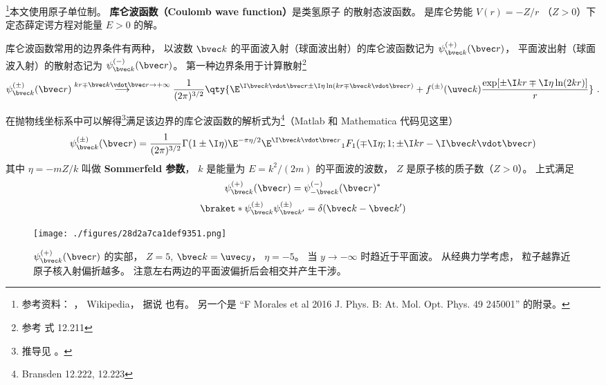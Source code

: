 

\footnote{参考资料： \cite{Bransden}， Wikipedia， 据说 \cite{Merzbacher} 也有。 另一个是 “F Morales et al 2016 J. Phys. B: At. Mol. Opt. Phys. 49 245001” 的附录。}本文使用原子单位制。 \textbf{库仑波函数（Coulomb wave function）}是类氢原子 的散射态波函数。
是库仑势能 $V(r) = -Z/r$ （$Z > 0$）下定态薛定谔方程对能量 $E > 0$ 的解。

库仑波函数常用的边界条件有两种， 以波数 $\bvec k$ 的平面波入射（球面波出射）的库仑波函数记为 $\psi_{\bvec k}^{(+)}(\bvec r)$， 平面波出射（球面波入射）的散射态记为 $\psi_{\bvec k}^{(-)}(\bvec r)$。 第一种边界条用于计算散射\footnote{参考\cite{Bransden} 式 12.211}
\begin{equation}\label{eq_CulmWf_4}
\psi_{\bvec k}^{(\pm)}(\bvec r) \overset{kr \mp \bvec k \vdot\bvec r \to +\infty}{\longrightarrow} \frac{1}{(2\pi)^{3/2}} \qty{\E^{\I\bvec k\vdot\bvec r \pm \I\eta\ln (kr \mp \bvec k \vdot\bvec r)}
+ f^{(\pm)}(\uvec k) \frac{\exp[\pm\I kr \mp \I\eta \ln(2kr)]}{r}}~.
\end{equation}

在抛物线坐标系中可以解得\footnote{推导见 \cite{Bransden}。}满足该边界的库仑波函数的解析式为\footnote{Bransden\cite{Bransden} 12.222, 12.223}（Matlab 和 Mathematica 代码见这里）
\begin{equation}\label{eq_CulmWf_7}
\psi_{\bvec k}^{(\pm)}(\bvec r) = \frac{1}{(2\pi)^{3/2}} \Gamma(1\pm \I\eta)\E^{-\pi\eta/2} \E^{\I\bvec k\vdot\bvec r} {_1F_1}(\mp\I\eta; 1; \pm\I kr - \I \bvec k\vdot \bvec r)
\end{equation}
其中 $\eta = -mZ/k$ 叫做 \textbf{Sommerfeld 参数}， $k$ 是能量为 $E = k^2/(2m)$ 的平面波的波数， $Z$ 是原子核的质子数（$Z > 0$）。 上式满足
\begin{equation}
\psi_{\bvec k}^{(+)}(\bvec r) = \psi_{-\bvec k}^{(-)}(\bvec r)^*
\end{equation}
\begin{equation}
\braket*{\psi_{\bvec k}^{(\pm)}}{\psi_{\bvec k'}^{(\pm)}} = \delta(\bvec k - \bvec k')
\end{equation}

\begin{figure}[ht]
\centering
\texttt{[image: ./figures/28d2a7ca1def9351.png]} %
\caption{$\psi_{\bvec k}^{(+)}(\bvec r)$ 的实部， $Z = 5$, $\bvec k = \uvec y$， $\eta = -5$。 当 $y \to -\infty$ 时趋近于平面波。 从经典力学考虑， 粒子越靠近原子核入射偏折越多。 注意左右两边的平面波偏折后会相交并产生干涉。} \label{fig_CulmWf_2}
\end{figure}

